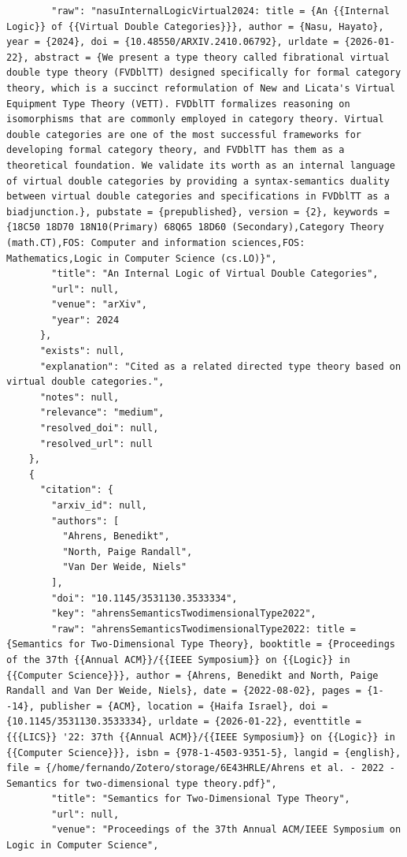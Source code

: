 \documentclass[11pt]{article}
\begin{document}
\begin{verbatim}
        "raw": "nasuInternalLogicVirtual2024: title = {An {{Internal Logic}} of {{Virtual Double Categories}}}, author = {Nasu, Hayato}, year = {2024}, doi = {10.48550/ARXIV.2410.06792}, urldate = {2026-01-22}, abstract = {We present a type theory called fibrational virtual double type theory (FVDblTT) designed specifically for formal category theory, which is a succinct reformulation of New and Licata's Virtual Equipment Type Theory (VETT). FVDblTT formalizes reasoning on isomorphisms that are commonly employed in category theory. Virtual double categories are one of the most successful frameworks for developing formal category theory, and FVDblTT has them as a theoretical foundation. We validate its worth as an internal language of virtual double categories by providing a syntax-semantics duality between virtual double categories and specifications in FVDblTT as a biadjunction.}, pubstate = {prepublished}, version = {2}, keywords = {18C50 18D70 18N10(Primary) 68Q65 18D60 (Secondary),Category Theory (math.CT),FOS: Computer and information sciences,FOS: Mathematics,Logic in Computer Science (cs.LO)}",
        "title": "An Internal Logic of Virtual Double Categories",
        "url": null,
        "venue": "arXiv",
        "year": 2024
      },
      "exists": null,
      "explanation": "Cited as a related directed type theory based on virtual double categories.",
      "notes": null,
      "relevance": "medium",
      "resolved_doi": null,
      "resolved_url": null
    },
    {
      "citation": {
        "arxiv_id": null,
        "authors": [
          "Ahrens, Benedikt",
          "North, Paige Randall",
          "Van Der Weide, Niels"
        ],
        "doi": "10.1145/3531130.3533334",
        "key": "ahrensSemanticsTwodimensionalType2022",
        "raw": "ahrensSemanticsTwodimensionalType2022: title = {Semantics for Two-Dimensional Type Theory}, booktitle = {Proceedings of the 37th {{Annual ACM}}/{{IEEE Symposium}} on {{Logic}} in {{Computer Science}}}, author = {Ahrens, Benedikt and North, Paige Randall and Van Der Weide, Niels}, date = {2022-08-02}, pages = {1--14}, publisher = {ACM}, location = {Haifa Israel}, doi = {10.1145/3531130.3533334}, urldate = {2026-01-22}, eventtitle = {{{LICS}} '22: 37th {{Annual ACM}}/{{IEEE Symposium}} on {{Logic}} in {{Computer Science}}}, isbn = {978-1-4503-9351-5}, langid = {english}, file = {/home/fernando/Zotero/storage/6E43HRLE/Ahrens et al. - 2022 - Semantics for two-dimensional type theory.pdf}",
        "title": "Semantics for Two-Dimensional Type Theory",
        "url": null,
        "venue": "Proceedings of the 37th Annual ACM/IEEE Symposium on Logic in Computer Science",

\end{verbatim}
\end{document}
